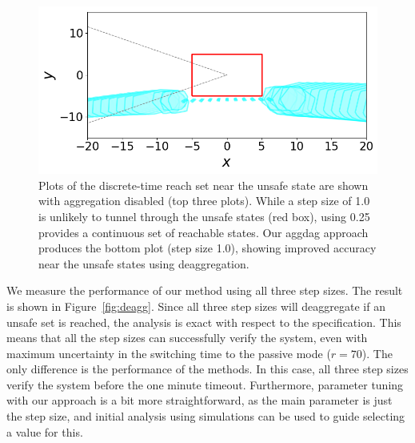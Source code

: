 \begin{figure}
\begin{minipage}[b]{\linewidth}
\end{minipage}
\\
\vspace{1em}
\begin{minipage}[b]{\linewidth}
  \centering
    \includegraphics[width=0.9\columnwidth,trim=0 1.3em 0 0, clip]{images/deagg_1_0.png}
\end{minipage}
\caption{Plots of the discrete-time reach set near the unsafe state are shown with aggregation disabled (top three plots).
  While a step size of 1.0 is unlikely to tunnel
  through the unsafe states (red box), using 0.25 provides a continuous set of reachable states. Our aggdag approach
  produces the bottom plot (step size 1.0), showing improved accuracy near the unsafe states using deaggregation.}\label{fig:step_size}
\end{figure}


We measure the performance of our method using all three step sizes.
%
The result is shown in Figure~\ref{fig:deagg}.
%
Since all three step sizes will deaggregate if an unsafe set is reached, the analysis is exact with respect to the specification.
%
This means that all the step sizes can successfully verify the system, even with maximum uncertainty in the switching time to the passive mode ($r = 70$).
%
The only difference is the performance of the methods.
%
In this case, all three step sizes verify the system before the one minute timeout.
%
Furthermore, parameter tuning with our approach is a bit more straightforward, as the main parameter is just the step size, and initial
analysis using simulations can be used to guide selecting a value for this.


